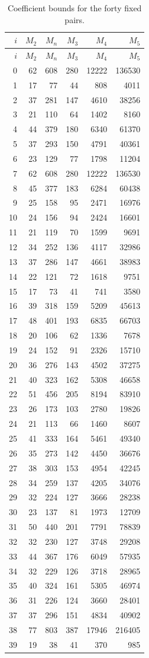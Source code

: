 \documentclass[12pt]{article}
\numberwithin{equation}{section}
\begin{document}
\endgroup
\begingroup\small
\setlength{\tabcolsep}{4pt}
\begin{longtable}{r|rrrrr}
\caption{Coefficient bounds for the forty fixed pairs.}\label{tab:pr-forty-coefficients}\\
$i$&$M_2$&$M_n$&$M_3$&$M_4$&$M_5$\\\hline\endfirsthead
$i$&$M_2$&$M_n$&$M_3$&$M_4$&$M_5$\\\hline\endhead
0&62&608&280&12222&136530\\
1&17&77&44&808&4011\\
2&37&281&147&4610&38256\\
3&21&110&64&1402&8160\\
4&44&379&180&6340&61370\\
5&37&293&150&4791&40361\\
6&23&129&77&1798&11204\\
7&62&608&280&12222&136530\\
8&45&377&183&6284&60438\\
9&25&158&95&2471&16976\\
10&24&156&94&2424&16601\\
11&21&119&70&1599&9691\\
12&34&252&136&4117&32986\\
13&37&286&147&4661&38983\\
14&22&121&72&1618&9751\\
15&17&73&41&741&3580\\
16&39&318&159&5209&45613\\
17&48&401&193&6835&66703\\
18&20&106&62&1336&7678\\
19&24&152&91&2326&15710\\
20&36&276&143&4502&37275\\
21&40&323&162&5308&46658\\
22&51&456&205&8194&83910\\
23&26&173&103&2780&19826\\
24&21&113&66&1460&8607\\
25&41&333&164&5461&49340\\
26&35&273&142&4450&36676\\
27&38&303&153&4954&42245\\
28&34&259&137&4205&34076\\
29&32&224&127&3666&28238\\
30&23&137&81&1973&12709\\
31&50&440&201&7791&78839\\
32&32&230&127&3748&29208\\
33&44&367&176&6049&57935\\
34&32&229&126&3718&28965\\
35&40&324&161&5305&46974\\
36&31&226&124&3660&28401\\
37&37&296&151&4834&40902\\
38&77&803&387&17946&216405\\
39&19&38&41&370&985\\
\end{longtable}
\endgroup
\end{document}
